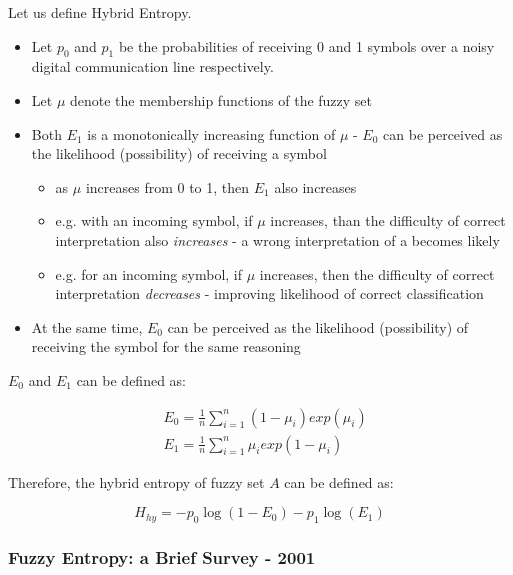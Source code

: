 Let us define Hybrid Entropy.

\begin{itemize}
\item Let $p_0$ and $p_1$ be the probabilities of receiving 0 and 1 symbols over a noisy digital communication line respectively.
\item Let $\mu$ denote the membership functions of the fuzzy set 
\item Both $E_1$ is a monotonically increasing function of $\mu$ - $E_0$ can be perceived as the likelihood (possibility) of receiving a  symbol
\begin{itemize}
    \item as $\mu$ increases from 0 to 1, then $E_1$ also increases
    \item e.g. with an incoming  symbol, if $\mu$ increases, than the difficulty of correct interpretation also \textit{increases} - a wrong interpretation of a  becomes likely
    \item e.g. for an incoming  symbol, if $\mu$ increases, then the difficulty of correct interpretation \textit{decreases} - improving likelihood of correct classification
  \end{itemize}
\item At the same time, $E_0$ can be perceived as the likelihood (possibility) of receiving the  symbol for the same reasoning
\end{itemize}

$E_0$ and $E_1$ can be defined as:

\begin{subequations} \label{eq:E0-E1}
  \begin{align}
    &E_0 = \frac{1}{n}\displaystyle\sum_{i=1}^{n}{(1-\mu_i)exp(\mu_i)} \\
    &E_1 = \frac{1}{n}\displaystyle\sum_{i=1}^{n}{\mu_iexp(1-\mu_i)}
  \end{align}
\end{subequations}

Therefore, the hybrid entropy of fuzzy set $A$ can be defined as:

\begin{equation}
  H_{hy} = -p_0\log(1 - E_0) - p_1\log(E_1)
\end{equation}

\subsubsection{Fuzzy Entropy: a Brief Survey - 2001}

